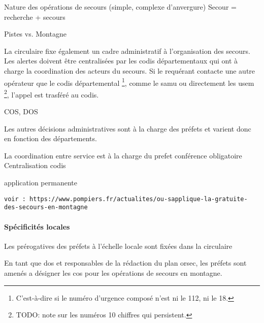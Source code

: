 Nature des opérations de secours (simple, complexe d'anvergure)
Secour = recherche + secours

Pistes vs. Montagne

La circulaire  fixe également un cadre administratif à
l'organisation des secours. Les alertes doivent être centralisées par
les \ac{codis} départementaux qui ont à charge la coordination des
acteurs du secours. Si le requérant contacte une autre opérateur que
le \ac{codis} départemental \footnote{C'est-à-dire si le numéro
  d'urgence composé n'est ni le 112, ni le 18.}, comme le \ac{samu} ou
directement les \ac{usem} \footnote{TODO: note sur les numéros 10
  chiffres qui persistent.}, l'appel est trasféré au \ac{codis}.



COS, DOS

Les autres décisions administratives sont à la charge des préfets et
varient donc en fonction des départements.

La coordination entre service est à la charge du prefet
conférence obligatoire
Centralisation codis

application permanente




\begin{verbatim}
voir : https://www.pompiers.fr/actualites/ou-sapplique-la-gratuite-des-secours-en-montagne
\end{verbatim}


\paragraph{Spécificités locales}

Les prérogatives des préfets à l'échelle locale sont fixées dans la
circulaire 

En tant que \ac{dos} et responsables de la rédaction du plan
\ac{orsec}, les préfets sont amenés a désigner les \ac{cos} pour les
opérations de secours en montagne.


